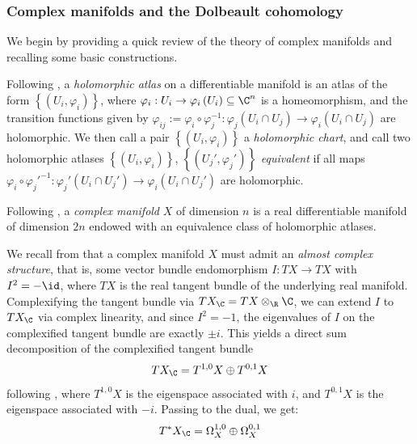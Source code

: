 \subsubsection{Complex manifolds and the Dolbeault cohomology}
We begin by providing a quick review of the theory of complex manifolds and recalling some basic constructions.
\begin{definition}
    Following \cite[Definition 2.1.1]{Huybrechts2005}, a \emph{holomorphic atlas} on a differentiable manifold is an atlas of the form $\left\{\left(U_i, \varphi_i\right)\right\}$, where $\varphi_i:U_i\to \varphi_i\left(U_i\right)\subseteq \C^n$ is a homeomorphism, and the transition functions given by $\varphi_{ij}:=\varphi_i\circ \varphi_j^{-1} : \varphi_j\left(U_i\cap U_j\right)\to \varphi_i\left(U_i\cap U_j\right)$ are holomorphic. We then call a pair $\left\{\left(U_i, \varphi_i\right)\right\}$ a \emph{holomorphic chart}, and call two holomorphic atlases $\left\{\left(U_i, \varphi_i\right)\right\}$, $\left\{\left(U_j', \varphi_j'\right)\right\}$ \emph{equivalent} if all maps $\varphi_i\circ \varphi_j'^{-1}: \varphi_j'\left(U_i\cap U_j'\right)\to \varphi_i\left(U_i\cap U_j'\right)$ are holomorphic. 
\end{definition}

\begin{definition}
Following \cite[Definition 2.1.2]{Huybrechts2005}, a \emph{complex manifold} $X$ of dimension $n$ is a real differentiable manifold of dimension $2n$ endowed with an equivalence class of holomorphic atlases.
\end{definition}

\noindent We recall from \cite[Proposition 2.6.2]{Huybrechts2005} that a complex manifold $X$ must admit an \emph{almost complex structure}, that is, some vector bundle endomorphism $I:TX\to TX$ with $I^2 = -\id$, where $TX$ is the real tangent bundle of the underlying real manifold. Complexifying the tangent bundle via $TX_\C = TX \otimes_\R \C$, we can extend $I$ to $TX_\C$ via complex linearity, and since $I^2=-1$, the eigenvalues of $I$ on the complexified tangent bundle are exactly $\pm i$. This yields a direct sum decomposition of the complexified tangent bundle
$$
TX_\C = T^{1,0}X \oplus T^{0,1}X
$$
following \cite[Proposition 2.6.4(i)]{Huybrechts2005}, where $T^{1,0}X$ is the eigenspace associated with $i$, and $T^{0,1}X$ is the eigenspace associated with $-i$. Passing to the dual, we get:
$$
T^*X_\C =\Omega^{1,0}_X \oplus \Omega^{0,1}_X
$$

